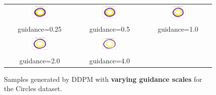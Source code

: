 \documentclass[11pt]{article}
\begin{document}
\begin{figure}[H]
    \centering
    \begin{tabular}{ccc}
        \includegraphics[width=0.3\textwidth]{exps/ddpm_2_150_0.0001_0.02_circles/samples_cfg_150_0.25.png} &
        \includegraphics[width=0.3\textwidth]{exps/ddpm_2_150_0.0001_0.02_circles/samples_cfg_150_0.5.png} &
        \includegraphics[width=0.3\textwidth]{exps/ddpm_2_150_0.0001_0.02_circles/samples_cfg_150_1.0.png} \\
        guidance=0.25 & guidance=0.5 & guidance=1.0 \\ [0.5em]

        \includegraphics[width=0.3\textwidth]{exps/ddpm_2_150_0.0001_0.02_circles/samples_cfg_150_2.0.png} &
        \includegraphics[width=0.3\textwidth]{exps/ddpm_2_150_0.0001_0.02_circles/samples_cfg_150_4.0.png} & \\
        guidance=2.0 & guidance=4.0 & \\
    \end{tabular}
    \caption{Samples generated by DDPM with \textbf{varying guidance scales} for the Circles dataset.}
    \label{fig:guidance_circles}
\end{figure}
\end{document}

